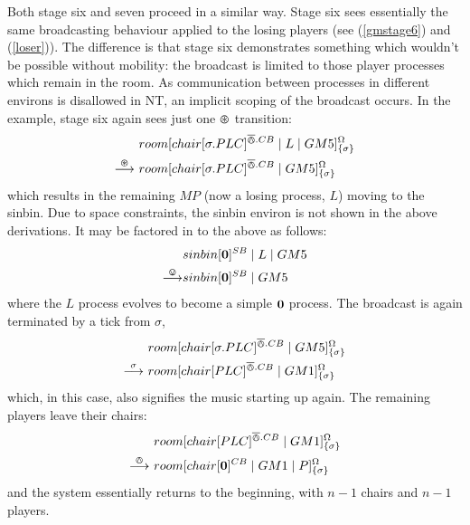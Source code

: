 Both stage six and seven proceed in a similar way.  Stage six sees
essentially the same broadcasting behaviour applied to the losing
players (see (\ref{gmstage6}) and (\ref{loser})).  The difference is
that stage six demonstrates something which wouldn't be possible without
mobility: the broadcast is limited to those player processes which
remain in the room.  As communication between processes in different
environs is disallowed in NT, an implicit scoping of the broadcast
occurs.  In the example, stage six again sees just one $\varoast$
transition:
\begin{equation}
\begin{aligned}
&  {room}[ {chair}[ \sigma.PLC ]^{\overline{\varowedge}.CB} \;|\; 
   L \;|\;
   GM5 ]^{\Omega}_{\{\sigma\}} \\
\stackrel{\varoast}{\longrightarrow}\ & {room}[ {chair}[ \sigma.PLC ]^{\overline{\varowedge}.CB} \;|\;
   GM5 ]^{\Omega}_{\{\sigma\}} \\
\end{aligned}
\end{equation}
which results in the remaining $MP$ (now a losing process, $L$) moving
to the sinbin.  Due to space constraints, the sinbin environ is not
shown in the above derivations.  It may be factored in to the above as
follows:
\begin{equation}
\begin{aligned}
& {sinbin}[ \textbf{0} ]^{SB} \;|\; L \;|\; GM5 \\
\stackrel{\varovee}{\longrightarrow} & {sinbin}[ \textbf{0} ]^{SB} \;|\; GM5
\end{aligned}
\end{equation}
 where the $L$ process evolves to become a simple $\textbf{0}$
process.  The broadcast is again terminated by a tick from $\sigma$,
\begin{equation}
\begin{aligned}
&  {room}[ {chair}[ \sigma.PLC ]^{\overline{\varowedge}.CB} \;|\;
   GM5 ]^{\Omega}_{\{\sigma\}} \\
\stackrel{\sigma}{\longrightarrow}\ & {room}[ {chair}[ PLC ]^{\overline{\varowedge}.CB} \;|\;
   GM1 ]^{\Omega}_{\{\sigma\}} 
\end{aligned}
\end{equation}
which, in this case, also signifies the music starting up again.  The
remaining players leave their chairs:
\begin{equation}
\begin{aligned}
& {room}[ {chair}[ PLC ]^{\overline{\varowedge}.CB} \;|\;
   GM1 ]^{\Omega}_{\{\sigma\}}   \\
\stackrel{\varowedge}{\longrightarrow}\ & {room}[ {chair}[ \textbf{0} ]^{CB} \;|\;
   GM1 \;|\; P ]^{\Omega}_{\{\sigma\}} 
\end{aligned}
\end{equation}
and the system essentially returns to the beginning, with $n -
1$ chairs and $n - 1$ players.

